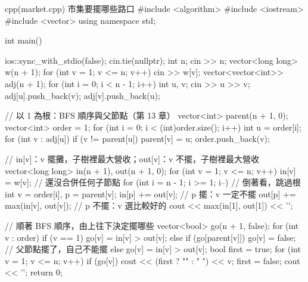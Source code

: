 \begin{example}[label=ex:tdp-mis]{cpp}{(market.cpp) 市集要擺哪些路口}
#include <algorithm>
#include <iostream>
#include <vector>
using namespace std;

int main() {
    ios::sync_with_stdio(false);
    cin.tie(nullptr);
    int n;
    cin >> n;
    vector<long long> w(n + 1);
    for (int v = 1; v <= n; v++) {
        cin >> w[v];
    }
    vector<vector<int>> adj(n + 1);
    for (int i = 0; i < n - 1; i++) {
        int u, v;
        cin >> u >> v;
        adj[u].push_back(v);
        adj[v].push_back(u);
    }

    // 以 1 為根：BFS 順序與父節點（第 13 章）
    vector<int> parent(n + 1, 0);
    vector<int> order = {1};
    for (int i = 0; i < (int)order.size(); i++) {
        int u = order[i];
        for (int v : adj[u]) {
            if (v != parent[u]) {
                parent[v] = u;
                order.push_back(v);
            }
        }
    }

    // in[v]：v 擺攤，子樹裡最大營收；out[v]：v 不擺，子樹裡最大營收
    vector<long long> in(n + 1), out(n + 1, 0);
    for (int v = 1; v <= n; v++) {
        in[v] = w[v];                       // 還沒合併任何子節點
    }
    for (int i = n - 1; i >= 1; i--) {      // 倒著看，跳過根
        int v = order[i], p = parent[v];
        in[p] += out[v];                    // p 擺：v 一定不擺
        out[p] += max(in[v], out[v]);       // p 不擺：v 選比較好的
    }
    cout << max(in[1], out[1]) << '\n';

    // 順著 BFS 順序，由上往下決定擺哪些
    vector<bool> go(n + 1, false);
    for (int v : order) {
        if (v == 1) {
            go[v] = in[v] > out[v];
        } else if (go[parent[v]]) {
            go[v] = false;                  // 父節點擺了，自己不能擺
        } else {
            go[v] = in[v] > out[v];
        }
    }
    bool first = true;
    for (int v = 1; v <= n; v++) {
        if (go[v]) {
            cout << (first ? "" : " ") << v;
            first = false;
        }
    }
    cout << '\n';
    return 0;
}
\end{example}


